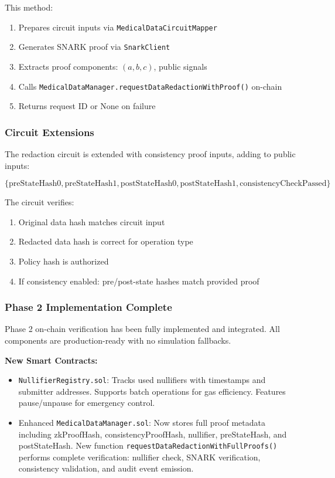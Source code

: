This method:
\begin{enumerate}
    \item Prepares circuit inputs via \texttt{MedicalDataCircuitMapper}
    \item Generates SNARK proof via \texttt{SnarkClient}
    \item Extracts proof components: $(a, b, c)$, public signals
    \item Calls \texttt{MedicalDataManager.requestDataRedactionWithProof()} on-chain
    \item Returns request ID or None on failure
\end{enumerate}

\subsubsection{Circuit Extensions}

The redaction circuit is extended with consistency proof inputs, adding to public inputs:

\begin{equation}
    \{\text{preStateHash0}, \text{preStateHash1}, \text{postStateHash0}, \text{postStateHash1}, \text{consistencyCheckPassed}\}
\end{equation}

The circuit verifies:
\begin{enumerate}
    \item Original data hash matches circuit input
    \item Redacted data hash is correct for operation type
    \item Policy hash is authorized
    \item If consistency enabled: pre/post-state hashes match provided proof
\end{enumerate}

\subsubsection{Phase 2 Implementation Complete}

Phase 2 on-chain verification has been fully implemented and integrated. All components are production-ready with no simulation fallbacks.

\textbf{New Smart Contracts:}
\begin{itemize}
    \item \texttt{NullifierRegistry.sol}: Tracks used nullifiers with timestamps and submitter addresses. Supports batch operations for gas efficiency. Features pause/unpause for emergency control.
    \item Enhanced \texttt{MedicalDataManager.sol}: Now stores full proof metadata including zkProofHash, consistencyProofHash, nullifier, preStateHash, and postStateHash. New function \texttt{requestDataRedactionWithFullProofs()} performs complete verification: nullifier check, SNARK verification, consistency validation, and audit event emission.
\end{itemize}

